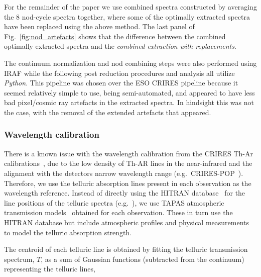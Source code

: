 \documentclass[fleqn,usenatbib]{mnras}
\begin{document}
For the remainder of the paper we use combined spectra constructed by averaging the 8 nod-cycle spectra together, where some of the optimally extracted spectra have been replaced using the above method. The last panel of Fig.~\ref{fig:nod_artefacts} shows that the difference between the combined optimally extracted spectra and the \emph{combined extraction with replacements}. 

The continuum normalization and nod combining steps were also performed using IRAF while the following post reduction procedures and analysis all utilize \emph{Python}. This pipeline was chosen over the ESO CRIRES pipeline because it seemed relatively simple to use, being semi-automated, and appeared to have less bad pixel/cosmic ray artefacts in the extracted spectra. In hindsight this was not the case, with the removal of the extended artefacts that appeared. 



\subsubsection{Wavelength calibration}
\label{subsec:wave_cal}
There is a known issue with the wavelength calibration from the CRIRES Th-Ar calibrations~\citep{kerber_laboratory_2009}, due to the low density of Th-AR lines in the near-infrared and the alignment with the detectors narrow wavelength range (e.g.\ CRIRES-POP~\citep{nicholls_crirespop_2017}).
Therefore, we use the telluric absorption lines present in each observation as the wavelength reference. Instead of directly using the HITRAN database~\citep{rothman_hitran2012_2013} for the line positions of the telluric spectra (e.g.~\citep{brogi_signature_2012,brogi_carbon_2014,dekok_detection_2013}), we use TAPAS atmospheric transmission models~\citep{bertaux_tapas_2014} obtained for each observation. These in turn use the HITRAN database but include atmospheric profiles and physical measurements to model the telluric absorption strength.

The centroid of each telluric line is obtained by fitting the telluric transmission spectrum, \(T \), as a sum of Gaussian functions (subtracted from the continuum) representing the telluric lines,
\end{document}
